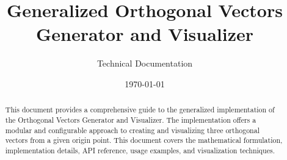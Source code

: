 \documentclass{article}
\title{Generalized Orthogonal Vectors\\Generator and Visualizer}
\author{Technical Documentation}
\date{\today}
\begin{document}
\maketitle

\begin{abstract}
This document provides a comprehensive guide to the generalized implementation of the Orthogonal Vectors Generator and Visualizer. The implementation offers a modular and configurable approach to creating and visualizing three orthogonal vectors from a given origin point. This document covers the mathematical formulation, implementation details, API reference, usage examples, and visualization techniques.
\end{abstract}

\tableofcontents
\newpage












\appendix

\end{document}
